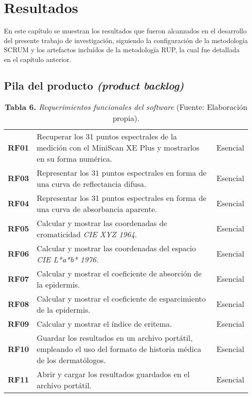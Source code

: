 \chapter{Resultados}

En este cap\'{i}tulo se muestran los resultados que fueron alcanzados en el desarrollo del presente trabajo de investigaci\'{o}n, siguiendo la configuraci\'{o}n de la metodolog\'{i}a SCRUM y los artefactos inclu\'{i}dos de la metodolog\'{i}a RUP, la cual fue detallada en el cap\'{i}tulo anterior.

\section{Pila del producto \textit{(product backlog)}}

	\FloatBarrier
	\begin{table}[htb]
		\small
		\caption{\textbf{Tabla 6.} \textit{Requerimientos funcionales del software} (Fuente: Elaboraci\'{o}n propia).}
		\centering
		\setlength{\extrarowheight}{\altocelda}
		\begin{tabulary}{\anchotabla}{|c|J|c|}
			\hline
			 &  & \\ \hline
			\textbf{RF01} & Recuperar los 31 puntos espectrales de la medici\'{o}n con el MiniScan XE Plus y mostrarlos en su forma num\'{e}rica. & Esencial\\ \hline

			\textbf{RF03} & Representar los 31 puntos espectrales en forma de una curva de reflectancia difusa. & Esencial\\ \hline
			\textbf{RF04} & Representar los 31 puntos espectrales en forma de una curva de absorbancia aparente. & Esencial\\ \hline
			\textbf{RF05} & Calcular y mostrar las coordenadas de cromaticidad \textit{CIE XYZ 1964}. & Esencial\\ \hline
			\textbf{RF06} & Calcular y mostrar las coordenadas del espacio \textit{CIE L*a*b* 1976}. & Esencial\\ \hline
			\textbf{RF07} & Calcular y mostrar el coeficiente de absorci\'{o}n de la epidermis. & Esencial\\ \hline
			\textbf{RF08} & Calcular y mostrar el coeficiente de esparcimiento de la epidermis. & Esencial\\ \hline
			\textbf{RF09} & Calcular y mostrar el \'{i}ndice de eritema. & Esencial\\ \hline
			\textbf{RF10} & Guardar los resultados en un archivo port\'{a}til, empleando el uso del formato de historia m\'{e}dica de los dermat\'{o}logos. & Esencial\\ \hline
			\textbf{RF11} & Abrir y cargar los resultados guardados en el archivo port\'{a}til. & Esencial\\ \hline
		\end{tabulary}
	\end{table}
\FloatBarrier

